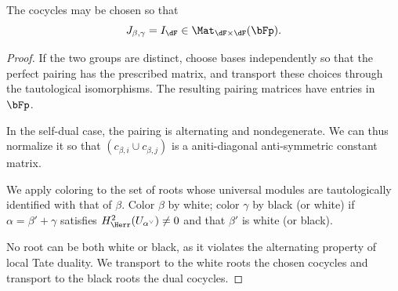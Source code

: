 
\begin{lem}
\label{lem:gs-cup}
The cocycles may be chosen so that
\[
    J_{\beta,\gamma}=I_{\dF}\in\Mat_{\dF\times\dF}(\bFp).
\]
\end{lem}

\begin{proof}
If the two groups are distinct, choose bases independently
so that the perfect pairing has the prescribed matrix, and transport these
choices through the tautological isomorphisms. The resulting pairing matrices
have entries in $\bFp$.

In the self-dual case, the pairing is alternating and nondegenerate.
We can thus normalize it so that
$(c_{\beta,i}\cup c_{\beta, j})$
is a aniti-diagonal anti-symmetric constant matrix.

We apply coloring to the set of roots whose universal modules
are tautologically identified with that of $\beta$.
Color $\beta$ by white;
color $\gamma$ by black (or white) if
$\alpha=\beta'+\gamma$ satisfies
$H^2_{\Herr}(U_{\alpha^\vee})\neq 0$
and that $\beta'$ is white (or black).

No root can be both white or black, as it violates the alternating property of local Tate duality.
We transport to the white roots the chosen cocycles
and transport to the black roots the dual cocycles.
\end{proof}
